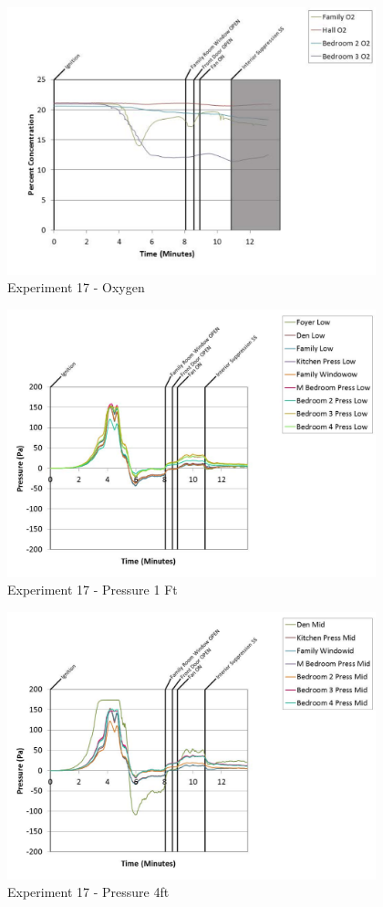\documentclass{article}
\begin{document}
\begin{appendices}
	\clearpage

	\begin{figure}[h!]
		\centering
		\includegraphics[height=3.05in]{0_Images/Results_Charts/Exp_17_Charts/Oxygen.pdf}
		\caption{Experiment 17 - Oxygen}
	\end{figure}
 

	\begin{figure}[h!]
		\centering
		\includegraphics[height=3.05in]{0_Images/Results_Charts/Exp_17_Charts/Pressure1Ft.pdf}
		\caption{Experiment 17 - Pressure 1 Ft}
	\end{figure}
 
	\clearpage

	\begin{figure}[h!]
		\centering
		\includegraphics[height=3.05in]{0_Images/Results_Charts/Exp_17_Charts/Pressure4ft.pdf}
		\caption{Experiment 17 - Pressure 4ft}
	\end{figure}
 


\end{appendices}
\end{document}
